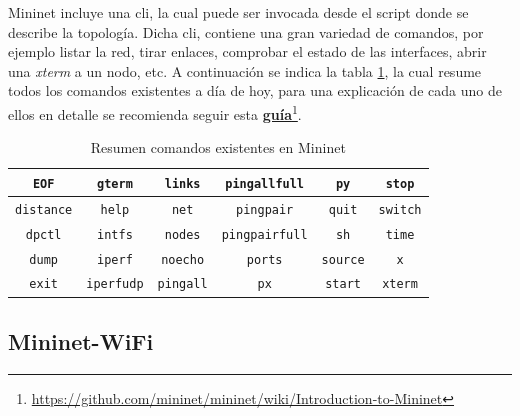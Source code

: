Mininet incluye una \gls{cli}, la cual puede ser invocada desde el script donde se describe la topología. Dicha \gls{cli}, contiene una gran variedad de comandos, por ejemplo listar la red, tirar enlaces, comprobar el estado de las interfaces, abrir una \textit{xterm} a un nodo, etc. A continuación se indica la tabla \ref{tab:cmdsMininet}, la cual resume todos los comandos existentes a día de hoy, para una explicación de cada uno de ellos en detalle se recomienda seguir esta \href{https://github.com/mininet/mininet/wiki/Introduction-to-Mininet}{\textbf{guía}}\footnote{\url{https://github.com/mininet/mininet/wiki/Introduction-to-Mininet}}.\\
\par

\begin{table}[!ht]
\centering
\begin{tabular}{|c|c|c|c|c|c|}
\hline
\texttt{EOF}      & \texttt{gterm}    & \texttt{links}   & \texttt{pingallfull}  & \texttt{py}     & \texttt{stop}   \\ \hline
\texttt{distance} & \texttt{help}     & \texttt{net}     & \texttt{pingpair}     & \texttt{quit}   & \texttt{switch} \\ \hline
\texttt{dpctl}    & \texttt{intfs}    & \texttt{nodes}   & \texttt{pingpairfull} & \texttt{sh}     & \texttt{time}   \\ \hline
\texttt{dump}     & \texttt{iperf}    & \texttt{noecho}  & \texttt{ports}        & \texttt{source} & \texttt{x}      \\ \hline
\texttt{exit}     & \texttt{iperfudp} & \texttt{pingall} & \texttt{px}           & \texttt{start}  & \texttt{xterm}  \\ \hline
\end{tabular}
\centering
\caption{Resumen comandos existentes en Mininet}
\label{tab:cmdsMininet}
\end{table}


\subsection{Mininet-WiFi}

